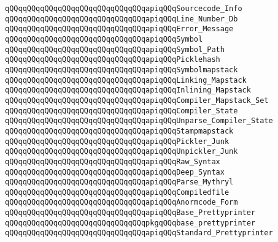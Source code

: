 \verb|qQQqqQQqqQQqqQQqqQQqqQQqqQQqqQQqapiqQQqSourcecode_Info|\newline
\verb|qQQqqQQqqQQqqQQqqQQqqQQqqQQqqQQqapiqQQqLine_Number_Db|\newline
\verb|qQQqqQQqqQQqqQQqqQQqqQQqqQQqqQQqapiqQQqError_Message|\newline
\verb|qQQqqQQqqQQqqQQqqQQqqQQqqQQqqQQqapiqQQqSymbol|\newline
\verb|qQQqqQQqqQQqqQQqqQQqqQQqqQQqqQQqapiqQQqSymbol_Path|\newline
\verb|qQQqqQQqqQQqqQQqqQQqqQQqqQQqqQQqapiqQQqPicklehash|\newline
\verb|qQQqqQQqqQQqqQQqqQQqqQQqqQQqqQQqapiqQQqSymbolmapstack|\newline
\verb|qQQqqQQqqQQqqQQqqQQqqQQqqQQqqQQqapiqQQqLinking_Mapstack|\newline
\verb|qQQqqQQqqQQqqQQqqQQqqQQqqQQqqQQqapiqQQqInlining_Mapstack|\newline
\verb|qQQqqQQqqQQqqQQqqQQqqQQqqQQqqQQqapiqQQqCompiler_Mapstack_Set|\newline
\verb|qQQqqQQqqQQqqQQqqQQqqQQqqQQqqQQqapiqQQqCompiler_State|\newline
\verb|qQQqqQQqqQQqqQQqqQQqqQQqqQQqqQQqapiqQQqUnparse_Compiler_State|\newline
\verb|qQQqqQQqqQQqqQQqqQQqqQQqqQQqqQQqapiqQQqStampmapstack|\newline
\verb|qQQqqQQqqQQqqQQqqQQqqQQqqQQqqQQqapiqQQqPickler_Junk|\newline
\verb|qQQqqQQqqQQqqQQqqQQqqQQqqQQqqQQqapiqQQqUnpickler_Junk|\newline
\verb|qQQqqQQqqQQqqQQqqQQqqQQqqQQqqQQqapiqQQqRaw_Syntax|\newline
\verb|qQQqqQQqqQQqqQQqqQQqqQQqqQQqqQQqapiqQQqDeep_Syntax|\newline
\verb|qQQqqQQqqQQqqQQqqQQqqQQqqQQqqQQqapiqQQqParse_Mythryl|\newline
\verb|qQQqqQQqqQQqqQQqqQQqqQQqqQQqqQQqapiqQQqCompiledfile|\newline
\verb|qQQqqQQqqQQqqQQqqQQqqQQqqQQqqQQqapiqQQqAnormcode_Form|\newline
\newline
\verb|qQQqqQQqqQQqqQQqqQQqqQQqqQQqqQQqapiqQQqBase_Prettyprinter|\newline
\verb|qQQqqQQqqQQqqQQqqQQqqQQqqQQqqQQqpkgqQQqbase_prettyprinter|\newline
\newline
\verb|qQQqqQQqqQQqqQQqqQQqqQQqqQQqqQQqapiqQQqStandard_Prettyprinter|\newline
